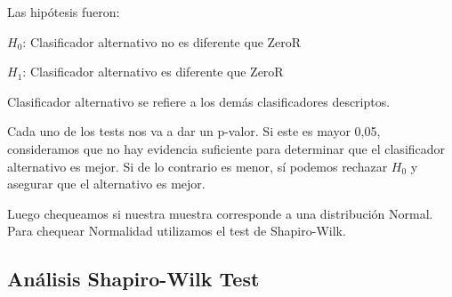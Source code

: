 %
%	

Las hipótesis fueron:

\vspace{0.5cm}
\hspace{2cm}$H_0$: Clasificador alternativo no es diferente que ZeroR
\vspace{0.25cm}

\hspace{2cm}$H_1$: Clasificador alternativo es diferente que ZeroR
\vspace{0.5cm}

Clasificador alternativo se refiere a los demás clasificadores descriptos. 

Cada uno de los tests nos va a dar un p-valor. Si este es mayor 0,05, consideramos que no hay evidencia suficiente para determinar que el clasificador alternativo es mejor. Si de lo contrario es menor, sí podemos rechazar $H_0$ y asegurar que el alternativo es mejor. 

Luego chequeamos si nuestra muestra corresponde a una distribución Normal. Para chequear Normalidad utilizamos el test de Shapiro-Wilk.

\subsection{Análisis Shapiro-Wilk Test}

